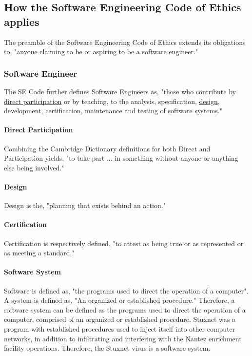 \documentclass[12pt]{article}
\begin{document}
\begin{multicols}{2}
\subsection{How the Software Engineering Code of Ethics applies}

The preamble of the Software Engineering Code of Ethics extends its obligations to, "anyone claiming to be or aspiring to be a software engineer."\cite{softwareEngineeringCodeOfEthics}

\subsubsection{Software Engineer}

The SE Code further defines Software Engineers as, "those who contribute by \underline{direct participation} or by teaching, to the analysis, specification, \underline{design}, development, \underline{certification}, maintenance and testing of \underline{software systems}."

\paragraph{Direct Participation}

Combining the Cambridge Dictionary definitions for both Direct and Participation yields, "to take part ... in something without anyone or anything else being involved."\cite{cambridgeDictionary}

\paragraph{Design}
Design is the, "planning that exists behind an action."\cite{designDefinition}

\paragraph{Certification}
Certification is respectively defined, "to attest as being true or as represented or as meeting a standard."\cite{cambridgeDictionary}

\paragraph{Software System}

Software is defined as, "the programs used to direct the operation of a computer".\cite{softwareSystemDefinition} A system is defined as, "An organized or established procedure."\cite{merriamWebsterDefinitions} Therefore, a software system can be defined as the programs used to direct the operation of a computer, comprised of an organized or established procedure. Stuxnet was a program with established procedures used to inject itself into other computer networks, in addition to infiltrating and interfering with the Nantez enrichment facility operations. Therefore, the Stuxnet virus is a software system.\cite{w32.stuxnetDossier}


\end{multicols}
\end{document}
